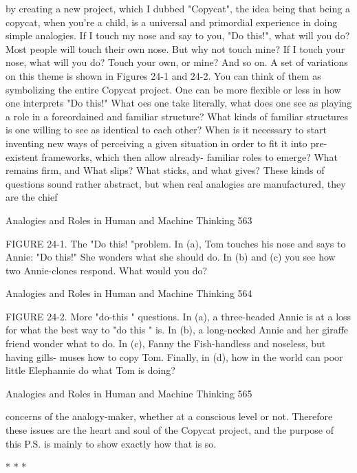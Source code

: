 by creating a new project, which I dubbed "Copycat", the idea being that being a
copycat, when you're a child, is a universal and primordial experience in doing simple
analogies. If I touch my nose and say to you, "Do this!", what will you do? Most
people will touch their own nose. But why not touch mine? If I touch your nose, what
will you do? Touch your own, or mine? And so on. A set of variations on this theme
is shown in Figures 24-1 and 24-2. You can think of them as symbolizing the entire
Copycat project.
        One can be more flexible or less in how one interprets "Do this!" What oes
one take literally, what does one see as playing a role in a foreordained and familiar
structure? What kinds of familiar structures is one willing to see as identical to each
other? When is it necessary to start inventing new ways of perceiving a given
situation in order to fit it into pre-existent frameworks, which then allow already-
familiar roles to emerge? What remains firm, and What slips? What sticks, and what
gives? These kinds of questions sound rather abstract, but when real analogies are
manufactured, they are the chief




Analogies and Roles in Human and Machine Thinking                                    563

FIGURE 24-1. The "Do this! "problem. In (a), Tom touches his nose and says to
Annie: "Do this!" She wonders what she should do. In (b) and (c) you see how two
Annie-clones respond. What would you do?




Analogies and Roles in Human and Machine Thinking                           564

FIGURE 24-2. More "do-this " questions. In (a), a three-headed Annie is at a loss for
what the best way to "do this " is. In (b), a long-necked Annie and her giraffe friend
wonder what to do. In (c), Fanny the Fish-handless and noseless, but having gills-
muses how to copy Tom. Finally, in (d), how in the world can poor little Elephannie
do what Tom is doing?




Analogies and Roles in Human and Machine Thinking                                 565

concerns of the analogy-maker, whether at a conscious level or not. Therefore these
issues are the heart and soul of the Copycat project, and the purpose of this P.S. is
mainly to show exactly how that is so.

                                        *   *   *

